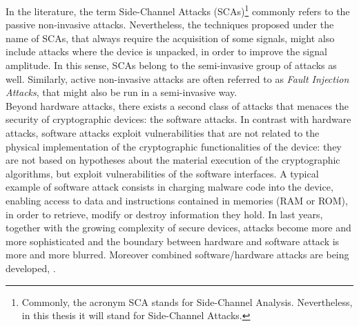 In the literature, the term Side-Channel Attacks (SCAs)\footnote{Commonly, the acronym SCA stands for \textquotedbl Side-Channel Analysis\textquotedbl. Nevertheless, in this thesis it will stand for \textquotedbl Side-Channel Attacks\textquotedbl.} commonly refers to the passive non-invasive attacks. Nevertheless, the techniques proposed under the name of SCAs, that always require the acquisition of some signals, might also include attacks where the device is unpacked, in order to improve the signal amplitude. In this sense, SCAs belong to the semi-invasive group of attacks as well. Similarly, active non-invasive attacks are often referred to as \emph{Fault Injection Attacks}, that might also be run in a semi-invasive way.\\

Beyond hardware attacks, there exists a second class of attacks that menaces the security of cryptographic devices: the software attacks. In contrast with hardware attacks, software attacks exploit vulnerabilities that are not related to the physical implementation of the cryptographic functionalities of the device: they are not based on hypotheses about the material execution of the cryptographic algorithms, but exploit vulnerabilities of the software interfaces. A typical example of software attack consists in charging malware code into the device, enabling access to data and instructions contained in memories (RAM or ROM), in order to retrieve, modify or destroy information they hold. In last years, together with the growing complexity of secure devices, attacks become more and more sophisticated and the boundary between hardware and software attack is more and more blurred. Moreover combined software/hardware attacks are being developed, \eg \cite{bouffard2011combined}.



